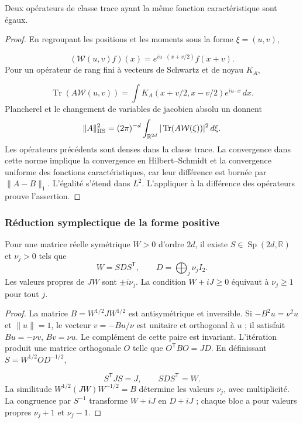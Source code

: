 \begin{lemma}
\label{md:antmem:gauss:lem:unicidad-weyl}
Deux opérateurs de classe trace ayant la même fonction caractéristique sont égaux.
\end{lemma}
\begin{proof}
En regroupant les positions et les moments sous la forme \(\xi=(u,v)\),

\[
 (\mathcal W(u,v)f)(x)=e^{iu\cdot(x+v/2)}f(x+v).
\]
Pour un opérateur de rang fini à vecteurs de Schwartz et de noyau \(K_A\),

\[
 \operatorname{Tr}(A\mathcal W(u,v))=\int K_A(x+v/2,x-v/2)e^{iu\cdot x}\,dx.
\]
Plancherel et le changement de variables de jacobien absolu un donnent
\[
 \|A\|_{\rm HS}^2=(2\pi)^{-d}\int_{\mathbb R^{2d}}
 |\operatorname{Tr}(A\mathcal W(\xi))|^2\,d\xi.
\]
Les opérateurs précédents sont denses dans la classe trace. La convergence
dans cette norme implique la convergence en Hilbert--Schmidt et la convergence
uniforme des fonctions caractéristiques, car leur différence est
bornée par \(\|A-B\|_1\). L’égalité s’étend dans \(L^2\).
L’appliquer à la différence des opérateurs prouve l’assertion.
\end{proof}

\subsubsection{Réduction symplectique de la forme positive
}
\begin{theorem}
\label{md:antmem:gauss:thm:williamson}
Pour une matrice réelle symétrique \(W>0\) d’ordre \(2d\), il existe
\(S\in\operatorname{Sp}(2d,\mathbb R)\) et \(\nu_j>0\) tels que
\[
 W=SDS^{\mathsf T},\qquad D=\bigoplus_j\nu_jI_2.
\]
Les valeurs propres de \(JW\) sont \(\pm i\nu_j\). La condition
\(W+iJ\geq0\) équivaut à \(\nu_j\geq1\) pour tout \(j\).

\end{theorem}
\begin{proof}
La matrice \(B=W^{1/2}JW^{1/2}\) est antisymétrique et inversible.
Si \(-B^2u=\nu^2u\) et \(\|u\|=1\), le vecteur
\(v=-Bu/\nu\) est unitaire et orthogonal à \(u\) ; il satisfait
\(Bu=-\nu v\), \(Bv=\nu u\). Le complément de cette paire est
invariant. L’itération produit une matrice orthogonale \(O\) telle que
\(O^{\mathsf T}BO=JD\). En définissant \(S=W^{1/2}OD^{-1/2}\),

\[
 S^{\mathsf T}JS=J,\qquad SDS^{\mathsf T}=W.
\]
La similitude \(W^{1/2}(JW)W^{-1/2}=B\) détermine les valeurs
\(\nu_j\), avec multiplicité. La congruence par \(S^{-1}\)
transforme \(W+iJ\) en \(D+iJ\) ; chaque bloc a pour valeurs propres
\(\nu_j+1\) et \(\nu_j-1\).
\end{proof}

